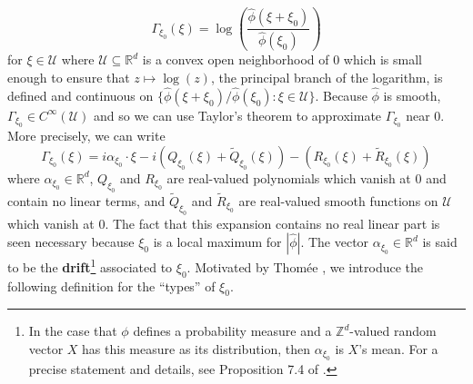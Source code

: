 \documentclass[11pt, letter]{book}
\begin{document}
\begin{equation*}\Gamma_{\xi_0}(\xi)=\log\left(\frac{\widehat{\phi}(\xi+\xi_0)}{\widehat{\phi}(\xi_0)}\right)
\end{equation*}
for $\xi\in \mathcal{U}$ where $\mathcal{U}\subseteq\mathbb{R}^d$ is a convex open neighborhood of $0$ which is small enough to ensure that $z\mapsto\log(z)$, the principal branch of the logarithm, is defined and continuous on $\{\widehat{\phi}(\xi+\xi_0)/\widehat{\phi}(\xi_0):\xi\in\mathcal{U}\}$. Because $\widehat{\phi}$ is smooth, $\Gamma_{\xi_0}\in C^{\infty}(\mathcal{U})$ and so we can use Taylor's theorem to approximate $\Gamma_{\xi_0}$ near $0$. More precisely, we can write
\begin{equation}\label{eq:GammaExpansion}
    \Gamma_{\xi_0}(\xi)=i\alpha_{\xi_0}\cdot\xi -i\left(Q_{\xi_0}(\xi)+\widetilde{Q}_{\xi_0}(\xi)\right)-\left(R_{\xi_0}(\xi)+\widetilde{R}_{\xi_0}(\xi)\right)
\end{equation}
where $\alpha_{\xi_0}\in\mathbb{R}^d$, $Q_{\xi_0}$ and $R_{\xi_0}$ are real-valued polynomials which vanish at $0$ and contain no linear terms, and $\widetilde{Q}_{\xi_0}$ and $\widetilde{R}_{\xi_0}$ are real-valued smooth functions on $\mathcal{U}$ which vanish at $0$. The fact that this expansion contains no real linear part is seen necessary because $\xi_0$ is a local maximum for $|\widehat{\phi}|$. The vector $\alpha_{\xi_0}\in\mathbb{R}^d$ is said to be the \textbf{drift}\footnote{In the case that $\phi$ defines a probability measure and a $\mathbb{Z}^d$-valued random vector $X$ has this measure as its distribution, then $\alpha_{\xi_0}$ is $X$'s mean. For a precise statement and details, see Proposition 7.4 of \cite{randles_convolution_2017}.} associated to $\xi_0$. Motivated by Thom\'{e}e \cite{thomee_stability_1965}, we introduce the following definition for the ``types'' of $\xi_0$.
\end{document}
